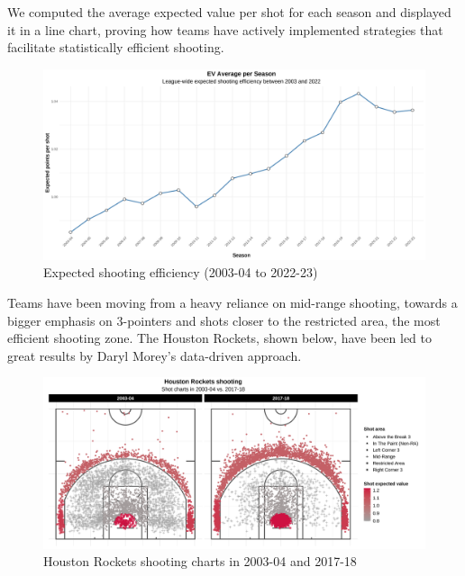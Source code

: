 \documentclass[
  ignorenonframetext,
]{beamer}
\begin{document}
\begin{frame}
We computed the average expected value per shot for each season and
displayed it in a line chart, proving how teams have actively
implemented strategies that facilitate statistically efficient shooting.

\begin{figure}

{\centering \includegraphics[width=1\linewidth]{latex/plotspres/plot_2} 

}

\caption{Expected shooting efficiency (2003-04 to 2022-23)}\label{fig:evprog}
\end{figure}
\end{frame}

\begin{frame}
Teams have been moving from a heavy reliance on mid-range shooting,
towards a bigger emphasis on 3-pointers and shots closer to the
restricted area, the most efficient shooting zone. The Houston Rockets,
shown below, have been led to great results by Daryl Morey's data-driven
approach.

\begin{figure}

{\centering \includegraphics[width=0.9\linewidth]{latex/plotspres/plot_4} 

}

\caption{Houston Rockets shooting charts in 2003-04 and 2017-18}\label{fig:rockets}
\end{figure}
\end{frame}
\end{document}
